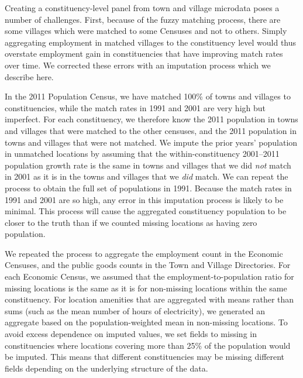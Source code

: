 \documentclass[12pt,letterpaper]{article}
\begin{document}
Creating a constituency-level panel from town and village microdata poses a number of challenges.  First, because of the fuzzy matching process, there are some villages which were matched to some Censuses and not to others. Simply aggregating employment in matched villages to the constituency level would thus overstate employment gain in constituencies that have improving match rates over time. We corrected these errors with an imputation process which we describe here.

In the 2011 Population Census, we have matched 100\% of towns and
villages to constituencies, while the match rates in 1991 and 2001 are
very high but imperfect. For each constituency, we therefore know the
2011 population in towns and villages that were matched to the other
censuses, and the 2011 population in towns and villages that were not
matched. We impute the prior years' population in unmatched locations
by assuming that the within-constituency 2001--2011 population growth
rate is the same in towns and villages that we did \textit{not} match
in 2001 as it is in the towns and villages that we \textit{did}
match. We can repeat the process to obtain the full set of populations
in 1991. Because the match rates in 1991 and 2001 are so high, any
error in this imputation process is likely to be minimal. This process
will cause the aggregated constituency population to be closer to the
truth than if we counted missing locations as having zero population.

We repeated the process to aggregate the employment count in the
Economic Censuses, and the public goods counts in the Town and Village
Directories. For each Economic Census, we assumed that the
employment-to-population ratio for missing locations is the same as it
is for non-missing locations within the same constituency. For
location amenities that are aggregated with means rather than sums
(such as the mean number of hours of electricity), we generated an
aggregate based on the population-weighted mean in non-missing
locations. To avoid excess dependence on imputed values, we set fields
to missing in constituencies where locations covering more than 25\%
of the population would be imputed. This means that different
constituencies may be missing different fields depending on the
underlying structure of the data.
\end{document}
